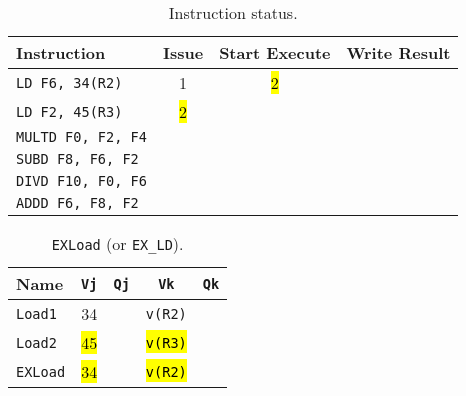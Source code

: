 \begin{enumerate}
    \begin{table}[!htp]
        \centering
        \begin{tabular}{@{} l | c c c @{}}
            \toprule
            Instruction                 & Issue & Start Execute & Write Result  \\
            \midrule
            \texttt{LD    F6, 34(R2)}   & 1     & \hl{2}        &               \\ [.3em]
            \texttt{LD    F2, 45(R3)}   & \hl{2}&               &               \\ [.3em]
            \texttt{MULTD F0, F2, F4}   &       &               &               \\ [.3em]
            \texttt{SUBD  F8, F6, F2}   &       &               &               \\ [.3em]
            \texttt{DIVD  F10, F0, F6}  &       &               &               \\ [.3em]
            \texttt{ADDD  F6, F8, F2}   &       &               &               \\
            \bottomrule
        \end{tabular}
        \caption*{Instruction status.}
    \end{table}

    \begin{table}[!htp]
        \centering
        \begin{tabular}{@{} l | c c c c @{}}
            \toprule
            Name            & \texttt{Vj}   & \texttt{Qj}   & \texttt{Vk}           & \texttt{Qk}   \\
            \midrule
            \texttt{Load1}  & 34            &               & \texttt{v(R2)}        &               \\ [.3em]
            \texttt{Load2}  & \hl{45}       &               & \hl{\texttt{v(R3)}}   &               \\
            \cmidrule{1-5}
            \texttt{EXLoad} & \hl{34}       &               & \hl{\texttt{v(R2)}}   &               \\
            \bottomrule
        \end{tabular}
        \caption*{\texttt{EXLoad} (or \texttt{EX\_LD}).}
    \end{table}


\end{enumerate}
